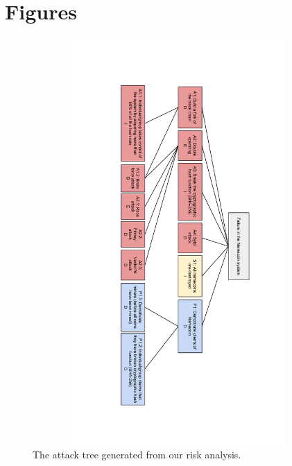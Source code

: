 \documentclass[frame, english]{idamasterthesis}
\begin{document}


\appendix
\chapter{Figures}
\chaptermark{}
\begin{figure}[h!]      %
    \centering
    \includegraphics[width = 120mm, height = 155mm]{Pics/attacktree.png}
    \caption{The attack tree generated from our risk analysis. }
    \label{fig:attacktree}
\end{figure}
\end{document}
